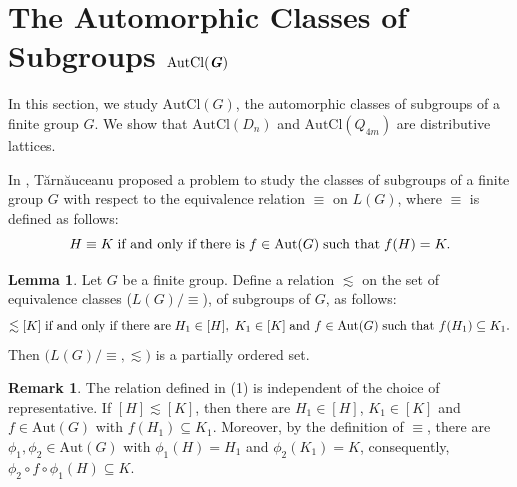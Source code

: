 \documentclass{article}
\newcommand\quotientthree[2]{{#1}\Big/{#2}}
\theoremstyle{definition}
\newtheorem{lemma}[theorem]{Lemma}
\newtheorem{remark}{Remark}
\begin{document}
\section{The Automorphic Classes of Subgroups $\text{AutCl}(\textbf{\emph{G}})$}
In this section, we study $\text{AutCl}(G)$, the automorphic classes of subgroups of a finite group $G$. We show that $\text{AutCl}(D_n)$ and $\text{AutCl}(Q_{4m})$ are distributive lattices. \par 
In \cite{tarnauceanu2015posetsclassesisomorphicsubgroups}, Tărnăuceanu proposed a problem to study the classes of subgroups of a finite group $G$ with respect to the equivalence relation $\equiv$ on $L(G)$, where $\equiv$ is defined as follows: 
\begin{equation*}
    H\equiv K \hspace{0.1cm}\text{if and only if}\hspace{0.1cm} \text{there is} \hspace{0.1cm}f \in \text{Aut}(G) \hspace{0.1cm}\text{such that} \hspace{0.1cm}f(H) = K. 
\end{equation*}
\begin{lemma}
Let $G$ be a finite group. Define a relation $\lesssim$ on the set of equivalence classes ($\quotientthree{L(G)}{\equiv}$), of subgroups of $G$, as follows: 
\begin{equation}
    [H]\lesssim [K] \hspace{0.1cm} \text{if and only if } \text{there are}\hspace{0.1cm} H_1 \in [H],\hspace{0.1cm} K_1 \in [K] \hspace{0.1cm}\text{and } f \in \text{Aut}(G) \hspace{0.1cm}\text{such that } f(H_1) \subseteq K_1.
\end{equation}
Then $\biggl(\quotientthree{L(G)}{\equiv}, \lesssim \bigg)$ is a partially ordered set.     
\end{lemma}
\begin{remark}
    The relation defined in (1) is independent of the choice of representative. If $[H]\lesssim [K]$, then there are $H_1\in [H]$, $K_1\in [K]$ and $f\in \text{Aut}(G)$ with $f(H_1)\subseteq K_1$. Moreover, by the definition of $\equiv$, there are $\phi_1, \phi_2 \in \text{Aut}(G)$ with $\phi_1(H)=H_1$ and $\phi_2(K_1)=K$, consequently, $\phi_2\circ f\circ\phi_1 (H)\subseteq K$. 
\end{remark}
\end{document}
